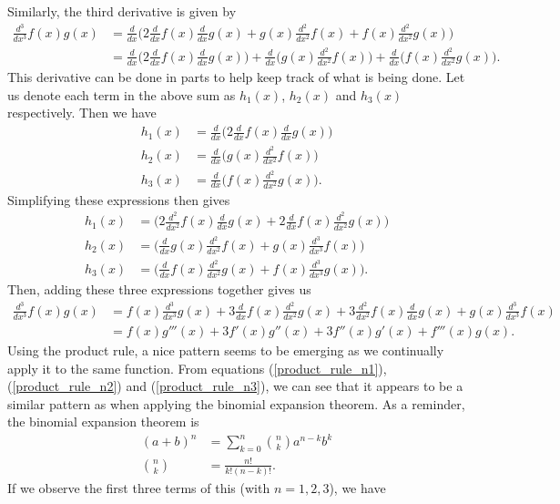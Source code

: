 Similarly, the third derivative is given by
\begin{align}
	\frac{d^3}{dx^3}f(x)g(x)&=\frac{d}{dx}\bigg(2\frac{d}{dx}f(x)\frac{d}{dx}g(x)+g(x)\frac{d^2}{dx^2}f(x)+f(x)\frac{d^2}{dx^2}g(x)\bigg) \\
	&=\frac{d}{dx}\bigg(2\frac{d}{dx}f(x)\frac{d}{dx}g(x)\bigg)+\frac{d}{dx}\bigg(g(x)\frac{d^2}{dx^2}f(x)\bigg)+\frac{d}{dx}\bigg(f(x)\frac{d^2}{dx^2}g(x)\bigg).
\end{align}
This derivative can be done in parts to help keep track of what is being done. Let us denote each term in the above sum as $h_1(x)$, $h_2(x)$ and $h_3(x)$ respectively. Then we have
\begin{align}
	h_1(x)&= \frac{d}{dx}\bigg(2\frac{d}{dx}f(x)\frac{d}{dx}g(x)\bigg) \\
	h_2(x)&=\frac{d}{dx}\bigg(g(x)\frac{d^2}{dx^2}f(x)\bigg) \\
	h_3(x)&=\frac{d}{dx}\bigg(f(x)\frac{d^2}{dx^2}g(x)\bigg).
\end{align}
Simplifying these expressions then gives
\begin{align}
	h_1(x)&= \bigg(2\frac{d^2}{dx^2}f(x)\frac{d}{dx}g(x)+2\frac{d}{dx}f(x)\frac{d^2}{dx^2}g(x)\bigg) \\
	h_2(x)&=\bigg(\frac{d}{dx}g(x)\frac{d^2}{dx^2}f(x)+g(x)\frac{d^3}{dx^3}f(x)\bigg) \\
	h_3(x)&=\bigg(\frac{d}{dx}f(x)\frac{d^2}{dx^2}g(x)+f(x)\frac{d^3}{dx^3}g(x)\bigg).
\end{align}
Then, adding these three expressions together gives us
\begin{align}
	\frac{d^3}{dx^3}f(x)g(x)&=f(x)\frac{d^3}{dx^3}g(x)+3\frac{d}{dx}f(x)\frac{d^2}{dx^2}g(x)+3\frac{d^2}{dx^2}f(x)\frac{d}{dx}g(x)+g(x)\frac{d^3}{dx^3}f(x)\\
	&=f(x)g'''(x)+3f'(x)g''(x)+3f''(x)g'(x)+f'''(x)g(x). \label{product_rule_n3}
\end{align}
Using the product rule, a nice pattern seems to be emerging as we continually apply it to the same function. From equations (\ref{product_rule_n1}), (\ref{product_rule_n2}) and (\ref{product_rule_n3}), we can see that it appears to be a similar pattern as when applying the binomial expansion theorem. As a reminder, the binomial expansion theorem is
\begin{align}
	(a+b)^n&=\sum_{k=0}^{n}{{n}\choose{k}}a^{n-k}b^k \\
	{{n}\choose{k}}&= \frac{n!}{k!(n-k)!}.
\end{align}
If we observe the first three terms of this (with $n=1,2,3$), we have
